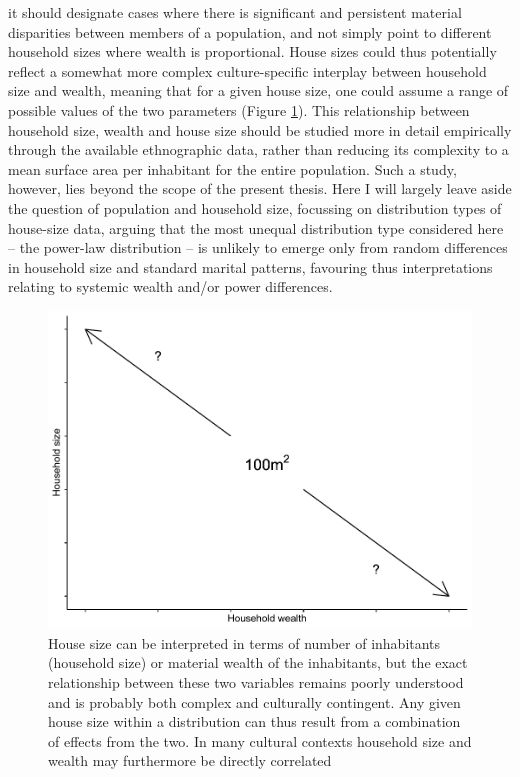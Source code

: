 \documentclass[
  12pt,
  a4paper, twoside]{book}
\begin{document}
it should designate cases where there is significant and persistent material disparities between members of a population, and not simply point to different household sizes where wealth is proportional. House sizes could thus potentially reflect a somewhat more complex culture-specific interplay between household size and wealth, meaning that for a given house size, one could assume a range of possible values of the two parameters (Figure \ref{fig:04-intro}). This relationship between household size, wealth and house size should be studied more in detail empirically through the available ethnographic data, rather than reducing its complexity to a mean surface area per inhabitant for the entire population. Such a study, however, lies beyond the scope of the present thesis. Here I will largely leave aside the question of population and household size, focussing on distribution types of house-size data, arguing that the most unequal distribution type considered here -- the power-law distribution -- is unlikely to emerge only from random differences in household size and standard marital patterns, favouring thus interpretations relating to systemic wealth and/or power differences.



\begin{figure}

{\centering \includegraphics[width=0.9\linewidth]{bookdown-demo_files/figure-latex/04-intro-1} 

}

\caption[House size, household size and wealth]{House size can be interpreted in terms of number of inhabitants (household size) or material wealth of the inhabitants, but the exact relationship between these two variables remains poorly understood and is probably both complex and culturally contingent. Any given house size within a distribution can thus result from a combination of effects from the two. In many cultural contexts household size and wealth may furthermore be directly correlated}\label{fig:04-intro}
\end{figure}
\end{document}
